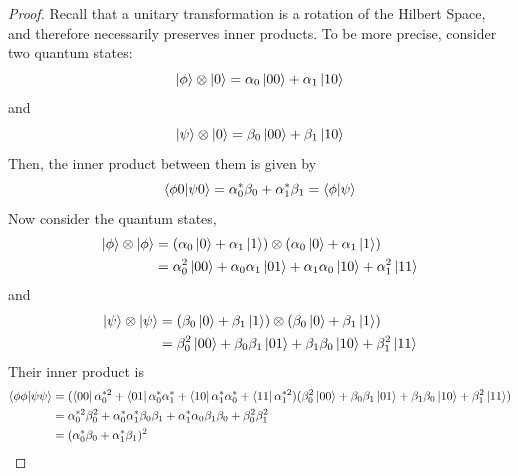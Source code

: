 \begin{proof}
    Recall that a unitary transformation is a rotation of the Hilbert Space, and therefore necessarily preserves inner products. To be more precise, consider two quantum states: 
    \[
    \ket{\phi} \otimes \ket{0}= \alpha_0\ket{00}+\alpha_1\ket{10}
    \]
    and 
    \[\ket{\psi}\otimes \ket{0}=\beta_0\ket{00}+\beta_1\ket{10}
    \]
    Then, the inner product between them is given by 
    \[
    \braket{\phi0|\psi0}=\alpha^*_0\beta_0+\alpha^*_1\beta_1=\braket{\phi|\psi}
    \]
    Now consider the quantum states, 
    \begin{align*}
    \ket{\phi} \otimes \ket{\phi}&=(\alpha_0\ket{0}+\alpha_1\ket{1})\otimes (\alpha_0\ket{0}+\alpha_1\ket{1})\\
    &=\alpha^2_0\ket{00}+\alpha_0\alpha_1\ket{01}+\alpha_1\alpha_0\ket{10}+\alpha^2_1\ket{11}
    \end{align*}
    and
    \begin{align*}
    \ket{\psi}\otimes \ket{\psi}&=(\beta_0\ket{0}+\beta_1\ket{1})\otimes (\beta_0\ket{0}+\beta_1\ket{1})\\
    &=\beta^2_0\ket{00}+\beta_0\beta_1\ket{01}+\beta_1\beta_0\ket{10}+\beta^2_1\ket{11}
    \end{align*}
    Their inner product is 
    \begin{align*}
    \braket{\phi\phi|\psi\psi}&=(\bra{00}\alpha^{*2}_0+\bra{01}\alpha^*_0\alpha^*_1+\bra{10}\alpha^*_1\alpha^*_0+\bra{11}\alpha^{*2}_1)(\beta^2_0\ket{00}+\beta_0\beta_1\ket{01}+\beta_1\beta_0\ket{10}+\beta^2_1\ket{11})\\
    &=\alpha^{*2}_0\beta^2_0+\alpha^*_0\alpha^*_1\beta_0\beta_1+\alpha^*_1\alpha_0\beta_1\beta_0+\beta^2_0\beta^2_1\\
    &=(\alpha^*_0\beta_0+\alpha^*_1\beta_1)^2
    \end{align*}


\end{proof}
